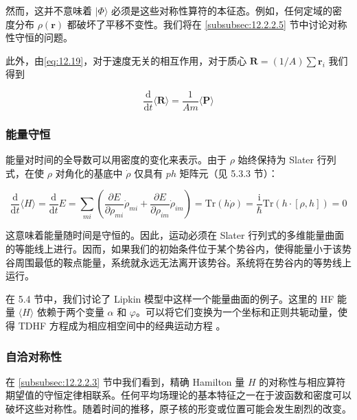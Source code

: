然而，这并不意味着 $|\Phi\rangle$ 必须是这些对称性算符的本征态。例如，任何定域的密度分布 $\rho(\boldsymbol{r})$
都破坏了平移不变性。我们将在 \ref{subsubsec:12.2.2.5} 节中讨论对称性守恒的问题。

此外，由\ref{eq:12.19}，对于速度无关的相互作用，对于质心 $\boldsymbol{R}=(1/A)\sum\boldsymbol{r}_{i}$
我们得到

\begin{equation}
\frac{\mathrm{d}}{\mathrm{d}t}\langle\boldsymbol{R}\rangle=\frac{1}{Am}\langle\boldsymbol{P}\rangle\label{eq:12.23}
\end{equation}


\subsubsection{能量守恒\label{subsubsec:12.2.2.4}}

能量对时间的全导数可以用密度的变化来表示。由于 $\rho$ 始终保持为 Slater 行列式，在使 $\rho$ 对角化的基底中
$\dot{\rho}$ 仅具有 $ph$ 矩阵元（见 5.3.3 节）：

\begin{equation}
\frac{\mathrm{d}}{\mathrm{d}t}\langle H\rangle=\frac{\mathrm{d}}{\mathrm{d}t}E=\sum_{mi}\left(\frac{\partial E}{\partial\rho_{mi}}\dot{\rho}_{mi}+\frac{\partial E}{\partial\rho_{im}}\dot{\rho}_{im}\right)=\mathrm{Tr}(h\dot{\rho})=\frac{\mathrm{i}}{\hbar}\mathrm{Tr}(h\cdot[\rho,h])=0\label{eq:12.24}
\end{equation}

这意味着能量随时间是守恒的。因此，运动必须在 Slater 行列式的多维能量曲面的等能线上进行。因而，如果我们的初始条件位于某个势谷内，使得能量小于该势谷周围最低的鞍点能量，系统就永远无法离开该势谷。系统将在势谷内的等势线上运行。

在 5.4 节中，我们讨论了 Lipkin 模型中这样一个能量曲面的例子。这里的 HF 能量 $\langle H\rangle$
依赖于两个变量 $\alpha$ 和 $\varphi$。可以将它们变换为一个坐标和正则共轭动量，使得 TDHF 方程成为相应相空间中的经典运动方程
\cite{KLD80}。

\subsubsection{自洽对称性\label{subsubsec:12.2.2.5}}

在 \ref{subsubsec:12.2.2.3} 节中我们看到，精确 Hamilton 量 $H$ 的对称性与相应算符期望值的守恒定律相联系。任何平均场理论的基本特征之一在于波函数和密度可以破坏这些对称性。随着时间的推移，原子核的形变或位置可能会发生剧烈的改变。

